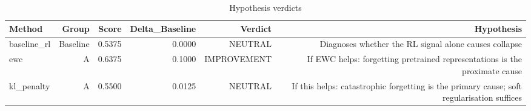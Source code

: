\begin{table}[htbp]
\centering
\caption{Hypothesis verdicts}
\label{tab:hyp-verdicts}
\begin{tabular}{lrrrrr}
\toprule
\textbf{Method} & \textbf{Group} & \textbf{Score} & \textbf{Delta\_Baseline} & \textbf{Verdict} & \textbf{Hypothesis} \\
\midrule
baseline\_rl & Baseline & 0.5375 & 0.0000 & NEUTRAL & Diagnoses whether the RL signal alone causes collapse \\
ewc & A & 0.6375 & 0.1000 & IMPROVEMENT & If EWC helps: forgetting pretrained representations is the proximate cause \\
kl\_penalty & A & 0.5500 & 0.0125 & NEUTRAL & If this helps: catastrophic forgetting is the primary cause; soft regularisation suffices \\
\bottomrule
\end{tabular}
\end{table}